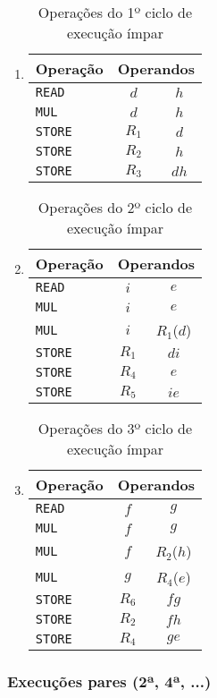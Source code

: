 \begin{enumerate}
\item %
\begin{table}[H]
\centering
\begin{tabular}{l|c|c}
Operação & \multicolumn{2}{|c}{Operandos} \\
\hline
\texttt{READ} & $d$ & $h$ \\
\hline
\texttt{MUL} & $d$ & $h$ \\
\hline
\texttt{STORE} & $R_1$ & $d$ \\
\texttt{STORE} & $R_2$ & $h$ \\
\texttt{STORE} & $R_3$ & $dh$ \\
\end{tabular}
\caption{Operações do 1º ciclo de execução ímpar}
\label{tab:odd_1}
\end{table}

\item %
\begin{table}[H]
\centering
\begin{tabular}{l|c|c}
Operação & \multicolumn{2}{|c}{Operandos} \\
\hline
\texttt{READ} & $i$ & $e$ \\
\hline
\texttt{MUL} & $i$ & $e$ \\
\texttt{MUL} & $i$ & $R_1$($d$) \\
\hline
\texttt{STORE} & $R_1$ & $di$ \\
\texttt{STORE} & $R_4$ & $e$ \\
\texttt{STORE} & $R_5$ & $ie$ \\
\end{tabular}
\caption{Operações do 2º ciclo de execução ímpar}
\label{tab:odd_2}
\end{table}

\item %
\begin{table}[H]
\centering
\begin{tabular}{l|c|c}
Operação & \multicolumn{2}{|c}{Operandos} \\
\hline
\texttt{READ} & $f$ & $g$ \\
\hline
\texttt{MUL} & $f$ & $g$ \\
\texttt{MUL} & $f$ & $R_2$($h$) \\
\texttt{MUL} & $g$ & $R_4$($e$) \\
\hline
\texttt{STORE} & $R_6$ & $fg$ \\
\texttt{STORE} & $R_2$ & $fh$ \\
\texttt{STORE} & $R_4$ & $ge$ \\
\end{tabular}
\caption{Operações do 3º ciclo de execução ímpar}
\label{tab:odd_3}
\end{table}


\end{enumerate}

\subsubsection{Execuções pares (2ª, 4ª, ...)}